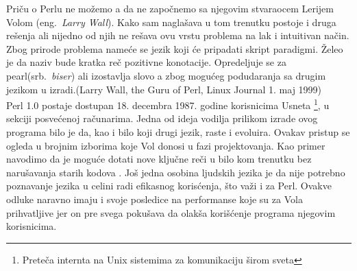 \documentclass[a4paper]{article}
\begin{document}
Priču o Perlu ne možemo a da ne započnemo sa njegovim stvaraocem Lerijem Volom (eng.~{\em Larry Wall}). Kako sam naglašava u tom trenutku postoje i druga rešenja ali nijedno od njih ne rešava ovu vrstu problema na lak i intuitivan način. Zbog prirode problema nameće se jezik koji će pripadati skript paradigmi. Želeo je da naziv bude kratka reč pozitivne konotacije. Opredeljuje se za pearl(srb.~{\em biser}) ali izostavlja slovo a zbog mogućeg podudaranja sa drugim jezikom u izradi.(Larry Wall, the Guru of Perl, Linux Journal 1. maj 1999)\\

Perl 1.0 postaje dostupan 18. decembra 1987. godine korisnicima Usneta \footnote{Preteča internta na Unix sistemima za komunikaciju širom sveta}, u sekciji posvećenoj ra\v cunarima. Jedna od ideja vodilja prilikom izrade ovog programa bilo je da, kao i bilo koji drugi jezik, raste i evoluira. Ovakav pristup se ogleda u brojnim izborima koje Vol donosi u fazi projektovanja. Kao primer navodimo da je moguće  dotati nove ključne reči u bilo kom trenutku bez narušavanja starih kodova \cite{id}. Još jedna osobina ljudskih jezika je da nije potrebno poznavanje jezika u celini radi efikasnog korisćenja, \v sto važi i za Perl. Ovakve odluke naravno imaju i svoje posledice na performanse koje su za Vola prihvatljive jer on pre svega pokušava da olakša korišćenje programa njegovim korisnicima.\\
\end{document}
